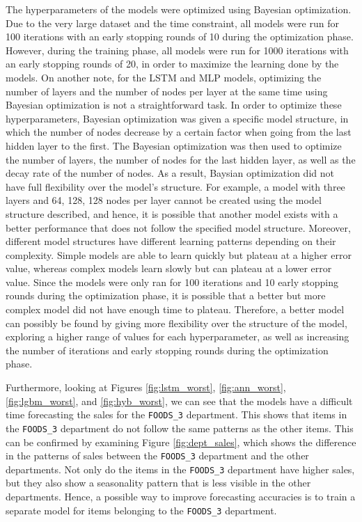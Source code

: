 The hyperparameters of the models were optimized using Bayesian optimization.
Due to the very large dataset and the time constraint, all models were run for 100 iterations with an early stopping rounds of 10 during the optimization phase. 
However, during the training phase, all models were run for 1000 iterations with an early stopping rounds of 20, in order to maximize the learning done by the models.
On another note, for the LSTM and MLP models, optimizing the number of layers and the number of nodes per layer at the same time using Bayesian optimization is not a straightforward task.
In order to optimize these hyperparameters, Bayesian optimization was given a specific model structure, in which the number of nodes decrease by a certain factor when going from the last hidden layer to the first.
The Bayesian optimization was then used to optimize the number of layers, the number of nodes for the last hidden layer, as well as the decay rate of the number of nodes.
As a result, Baysian optimization did not have full flexibility over the model's structure. 
For example, a model with three layers and 64, 128, 128 nodes per layer cannot be created using the model structure described, and hence, it is possible that another model exists with a better performance that does not follow the specified model structure.
Moreover, different model structures have different learning patterns depending on their complexity. 
Simple models are able to learn quickly but plateau at a higher error value, whereas complex models learn slowly but can plateau at a lower error value.
Since the models were only ran for 100 iterations and 10 early stopping rounds during the optimization phase, it is possible that a better but more complex model did not have enough time to plateau.
Therefore, a better model can possibly be found by giving more flexibility over the structure of the model, exploring a higher range of values for each hyperparameter, as well as increasing the number of iterations and early stopping rounds during the optimization phase.

Furthermore, looking at Figures \ref{fig:lstm_worst}, \ref{fig:ann_worst}, \ref{fig:lgbm_worst}, and \ref{fig:hyb_worst}, we can see that the models have a difficult time forecasting the sales for the \texttt{FOODS\_3} department.
This shows that items in the \texttt{FOODS\_3} department do not follow the same patterns as the other items.
This can be confirmed by examining Figure \ref{fig:dept_sales}, which shows the difference in the patterns of sales between the \texttt{FOODS\_3} department and the other departments.
Not only do the items in the \texttt{FOODS\_3} department have higher sales, but they also show a seasonality pattern that is less visible in the other departments.
Hence, a possible way to improve forecasting accuracies is to train a separate model for items belonging to the \texttt{FOODS\_3} department.

